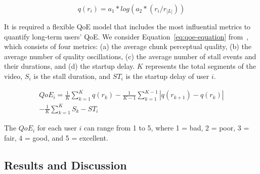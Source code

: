 \begin{equation}\label{eq:equation-1}
q(r_i) = a_1 * log(a_2 * (r_i/ r_{|L|}))
\end{equation}

It is required a flexible QoE model that includes the most influential metrics to quantify long-term users' QoE. 
We consider Equation~\ref{eq:qoe-equation} from~\cite{bentaleb:2018:MSys}, which consists of four metrics: (a) the average chunk perceptual quality, (b) the average number of quality oscillations, (c) the average number of stall events and their durations, and (d) the startup delay. $K$ represents the total segments of the video, $S_{i}$ is the stall duration, and $ST_{i}$ is the startup delay of user $i$.

\begin{equation}\label{eq:qoe-equation}
\begin{split}
QoE_i = \frac{1}{K} \sum_{k=1}^{K}q(r_{k}) - \frac{1}{K-1} \sum_{k=1}^{K-1}|q(r_{k+1}) - q(r_{k})| \\
- \frac{1}{K}\sum_{k=1}^{K} S_{k} - ST_{i}
\end{split}
\end{equation}

The $QoE_{i}$ for each user $i$ can range from 1 to 5, where 1 = bad, 2 = poor, 3 = fair, 4 = good, and 5 = excellent.

%

\subsection{Results and Discussion}


